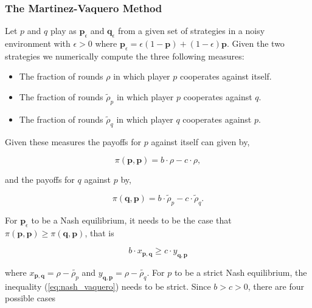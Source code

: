 \documentclass{article}
\theoremstyle{definition}
\begin{document}
\subsubsection{The Martinez-Vaquero Method}

Let \(p\) and \(q\) play as \(\mathbf{p}_{\epsilon}\) and
\(\mathbf{q}_{\epsilon}\) from a given set of strategies in a noisy environment
with \(\epsilon > 0\) where \(\mathbf{p}_{\epsilon} = \epsilon(1 - \mathbf{p}) +
(1 - \epsilon)\mathbf{p} \). Given the two strategies we numerically compute
the three following measures:


\begin{itemize}
  \item The fraction of rounds \(\rho\) in which player \(p\) cooperates against itself.
  \item The fraction of rounds \(\tilde{\rho}_p\) in which player \(p\) cooperates against \(q\).
  \item The fraction of rounds \(\tilde{\rho}_q\) in which player \(q\) cooperates against \(p\).
\end{itemize}

Given these measures the payoffs for \(p\) against itself can given by,

\[\pi (\mathbf{p}, \mathbf{p}) = b \cdot \rho - c\cdot\rho,\]

and the payoffs for \(q\) against \(p\) by,

\[\pi(\mathbf{q}, \mathbf{p}) = b \cdot \tilde{\rho}_p - c\cdot\tilde{\rho}_q.\]

For \(\mathbf{p}_{\epsilon}\) to be a Nash equilibrium, it needs to be the case that \(\pi (\mathbf{p}, \mathbf{p}) \geq
\pi(\mathbf{q}, \mathbf{p})\), that is

\begin{equation}\label{eq:nash_vaquero}
  b \cdot x_{\mathbf{p}, \mathbf{q}} \geq c \cdot y_{\mathbf{q}, \mathbf{p}}
\end{equation}

where \(x_{\mathbf{p}, \mathbf{q}} = \rho - \tilde{\rho_p}\) and  \(y_{\mathbf{q}, \mathbf{p}} = \rho - \tilde{\rho_q}\).
For \(p\) to be a strict Nash equilibrium, the inequality (\ref{eq:nash_vaquero}) needs
to be strict. Since \(b > c > 0\), there are four possible cases
\end{document}
